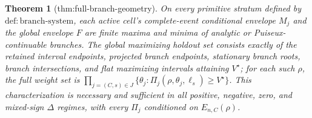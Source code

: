 \documentclass{article}
\newtheorem{theorem}{Theorem}
\begin{document}
\begin{theorem}[thm:full-branch-geometry]\label{thm:full-branch-geometry}
On every primitive stratum defined by \(\mathrm{def{:}branch\mbox{-}system}\), each active cell's complete-event conditional envelope \(M_j\) and the global envelope \(F\) are finite maxima and minima of analytic or Puiseux-continuable branches. The global maximizing holdout set consists exactly of the retained interval endpoints, projected branch endpoints, stationary branch roots, branch intersections, and flat maximizing intervals attaining \(V^{\star}\); for each such \(\rho\), the full weight set is \(\prod_{j=(C,s)\in J}\{\theta_j:\Pi_j(\rho,\theta_j,\ell_s)\ge V^{\star}\}\). This characterization is necessary and sufficient in all positive, negative, zero, and mixed-sign \(\Delta\) regimes, with every \(\Pi_j\) conditioned on \(E_{n,C}(\rho)\).
\end{theorem}
\end{document}

